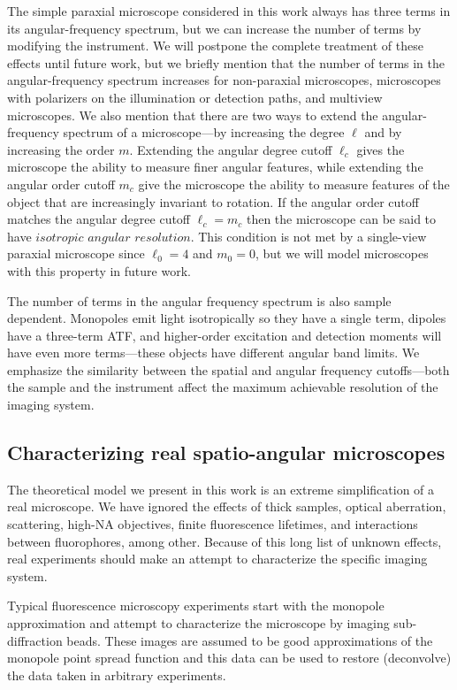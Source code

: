 \documentclass[]{osa-article}
\begin{document}
The simple paraxial microscope considered in this work always has three terms in
its angular-frequency spectrum, but we can increase the number of terms by
modifying the instrument. We will postpone the complete treatment of these
effects until future work, but we briefly mention that the number of terms in
the angular-frequency spectrum increases for non-paraxial microscopes,
microscopes with polarizers on the illumination or detection paths, and
multiview microscopes. We also mention that there are two ways to extend the
angular-frequency spectrum of a microscope---by increasing the degree $\ell$ and
by increasing the order $m$. Extending the angular degree cutoff $\ell_c$ gives
the microscope the ability to measure finer angular features, while extending
the angular order cutoff $m_c$ give the microscope the ability to measure
features of the object that are increasingly invariant to rotation. If the
angular order cutoff matches the angular degree cutoff $\ell_c = m_c$ then the
microscope can be said to have $\textit{isotropic angular resolution}$. This
condition is not met by a single-view paraxial microscope since $\ell_0 = 4$ and
$m_0 = 0$, but we will model microscopes with this property in future work.

The number of terms in the angular frequency spectrum is also sample dependent.
Monopoles emit light isotropically so they have a single term, dipoles have a
three-term ATF, and higher-order excitation and detection moments will have even
more terms---these objects have different angular band limits. We emphasize the
similarity between the spatial and angular frequency cutoffs---both the sample
and the instrument affect the maximum achievable resolution of the imaging
system.

\subsection{Characterizing real spatio-angular microscopes}
The theoretical model we present in this work is an extreme simplification of a
real microscope. We have ignored the effects of thick samples, optical
aberration, scattering, high-NA objectives, finite fluorescence lifetimes, and
interactions between fluorophores, among other. Because of this long list of
unknown effects, real experiments should make an attempt to characterize the
specific imaging system.

Typical fluorescence microscopy experiments start with the monopole
approximation and attempt to characterize the microscope by imaging
sub-diffraction beads. These images are assumed to be good approximations of the
monopole point spread function and this data can be used to restore (deconvolve)
the data taken in arbitrary experiments.
\end{document}
